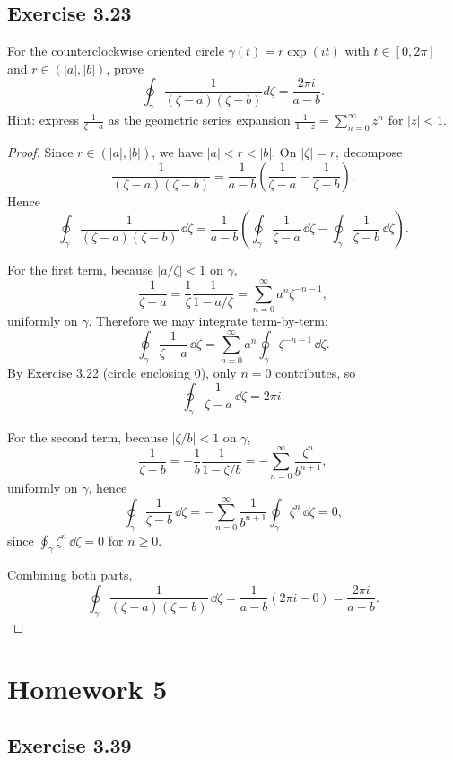 \documentclass{article}
\begin{document}
\subsection{Exercise 3.23}

For the counterclockwise oriented circle $\gamma(t) = r\exp(it)$ with
$t \in [0, 2\pi]$ and $r \in (|a|, |b|)$, prove
\[
  \oint_\gamma \frac{1}{(\zeta - a)(\zeta - b)} d\zeta = \frac{2\pi i}{a - b}.
\]
Hint: express $\frac{1}{\zeta - a}$ as the geometric series expansion
$\frac{1}{1-z} = \sum_{n=0}^\infty z^n$ for $|z| < 1$.

\begin{proof}
  Since $r\in(|a|,|b|)$, we have $|a|<r<|b|$. On $|\zeta|=r$,
  decompose
  \[
    \frac{1}{(\zeta-a)(\zeta-b)}
    =\frac{1}{a-b}\left(\frac{1}{\zeta-a}-\frac{1}{\zeta-b}\right).
  \]
  Hence
  \[
    \oint_\gamma \frac{1}{(\zeta-a)(\zeta-b)}\,\dd\zeta
    =\frac{1}{a-b}\left(
      \oint_\gamma\frac{1}{\zeta-a}\,\dd\zeta
      -
      \oint_\gamma\frac{1}{\zeta-b}\,\dd\zeta
    \right).
  \]

  For the first term, because $|a/\zeta|<1$ on $\gamma$,
  \[
    \frac{1}{\zeta-a}
    =\frac{1}{\zeta}\frac{1}{1-a/\zeta}
    =\sum_{n=0}^{\infty}a^n\zeta^{-n-1},
  \]
  uniformly on $\gamma$. Therefore we may integrate term-by-term:
  \[
    \oint_\gamma\frac{1}{\zeta-a}\,\dd\zeta
    =\sum_{n=0}^{\infty}a^n\oint_\gamma\zeta^{-n-1}\,\dd\zeta.
  \]
  By Exercise 3.22 (circle enclosing $0$), only $n=0$ contributes, so
  \[
    \oint_\gamma\frac{1}{\zeta-a}\,\dd\zeta=2\pi i.
  \]

  For the second term, because $|\zeta/b|<1$ on $\gamma$,
  \[
    \frac{1}{\zeta-b}
    =-\frac{1}{b}\frac{1}{1-\zeta/b}
    =-\sum_{n=0}^{\infty}\frac{\zeta^n}{b^{n+1}},
  \]
  uniformly on $\gamma$, hence
  \[
    \oint_\gamma\frac{1}{\zeta-b}\,\dd\zeta
    =-\sum_{n=0}^{\infty}\frac{1}{b^{n+1}}\oint_\gamma\zeta^n\,\dd\zeta=0,
  \]
  since $\oint_\gamma\zeta^n\,\dd\zeta=0$ for $n\ge0$.

  Combining both parts,
  \[
    \oint_\gamma \frac{1}{(\zeta-a)(\zeta-b)}\,\dd\zeta
    =\frac{1}{a-b}(2\pi i-0)
    =\frac{2\pi i}{a-b}.
  \]
\end{proof}

\section{Homework 5}

\subsection{Exercise 3.39}
\end{document}
